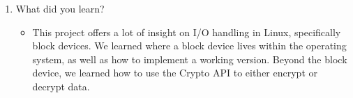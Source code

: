 \documentclass[letterpaper,10pt,onecolumn]{IEEEtran}
\begin{document}
\begin{enumerate}
\begin{itemize}
        \end{itemize}
        \item What did you learn?
        \begin{itemize}
            \item This project offers a lot of insight on I/O handling in Linux, specifically block devices. We learned where a block device lives within the operating system, as well as how to implement a working version. Beyond the block device, we learned how to use the Crypto API to either encrypt or decrypt data. 
        \end{itemize}
    \end{enumerate}
    
    
\end{document}

